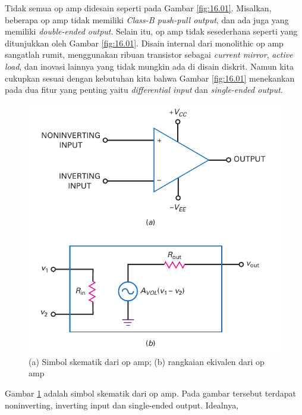 Tidak semua op amp didesain seperti pada Gambar \ref{fig:16.01}. Misalkan, beberapa op amp tidak memiliki\textit{ Class-B push-pull output}, dan ada juga yang memiliki \textit{double-ended output}. Selain itu, op amp tidak sesederhana seperti yang ditunjukkan oleh Gambar \ref{fig:16.01}. Disain internal dari monolithic op amp sangatlah rumit, menggunakan ribuan transistor sebagai \textit{current mirror}, \textit{active load}, dan inovasi lainnya yang tidak mungkin ada di disain diskrit. Namun kita cukupkan sesuai dengan kebutuhan kita bahwa Gambar \ref{fig:16.01} menekankan pada dua fitur yang penting yaitu \textit{differential input} dan \textit{single-ended output}.

\begin{figure}
	\centering
	\includegraphics[width=0.7\linewidth]{pic/fig:16.02}
	\caption{(a) Simbol skematik dari op amp; (b) rangkaian ekivalen dari op amp}
	\label{fig:16.02}
\end{figure}

Gambar \ref{fig:16.02} adalah simbol skematik dari op amp. Pada gambar tersebut terdapat noninverting, inverting input dan single-ended output. Idealnya,